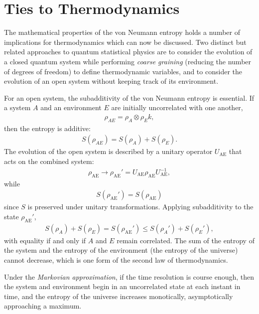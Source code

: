 \documentclass[a4paper, 12pt]{article}
\numberwithin{equation}{section}
\numberwithin{figure}{section}
\theoremstyle{definition}
\begin{document}
    \section{Ties to Thermodynamics}
    The mathematical properties of the von Neumann entropy holds a number of implications for thermodynamics which can now be discussed. Two distinct but related approaches to quantum statistical physics are to consider the evolution of a closed quantum system while performing \textit{coarse graining} (reducing the number of degrees of freedom) to define thermodynamic variables, and to consider the evolution of an open system without keeping track of its environment. \par
    For an open system, the subadditivity of the von Neumann entropy is essential. If a system $A$ and an environment $E$ are initially uncorrelated with one another,
    \begin{align}
        \rho_{AE} = \rho_A \otimes \rho_Ek,
    \end{align}
    then the entropy is additive:
    \begin{align}
        S(\rho_{AE}) = S(\rho_A) + S(\rho_E).
    \end{align}
    The evolution of the open system is described by a unitary operator $U_\text{AE}$ that acts on the combined system:
    \begin{align}
        \rho_\text{AE} \to \rho_\text{AE}' = U_\text{AE} \rho_\text{AE} U_\text{AE}^{-1},
    \end{align}
    while
    \begin{align}
        S(\rho_\text{AE}') = S(\rho_\text{AE})
    \end{align}
    since $S$ is preserved under unitary transformations. Applying subadditivity to the state $\rho_\text{AE}'$,
    \begin{align}
        S(\rho_A) + S(\rho_E) = S(\rho_\text{AE}') \leq S(\rho_A') + S(\rho_E'),
    \end{align}
    with equality if and only if $A$ and $E$ remain correlated. The sum of the entropy of the system and the entropy of the environment (the entropy of the universe) cannot decrease, which is one form of the second law of thermodynamics. \par
    Under the \textit{Markovian approximation}, if the time resolution is course enough, then the system and environment begin in an uncorrelated state at each instant in time, and the entropy of the universe increases monotically, asymptotically approaching a maximum. \par
\end{document}
